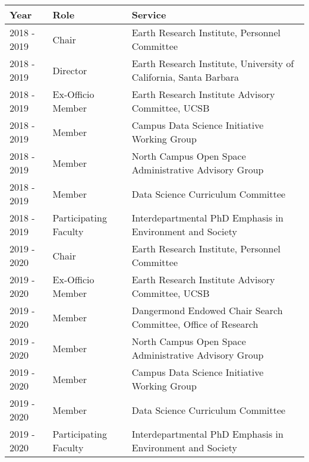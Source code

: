 
\begin{longtable}{llp{12cm}}
Year & Role & Service\\
\hline 
\endhead 
2018 - 2019 & Chair & Earth Research Institute, Personnel Committee \\
2018 - 2019 & Director & Earth Research Institute, University of California, Santa Barbara \\
2018 - 2019 & Ex-Officio Member & Earth Research Institute Advisory Committee, UCSB \\
2018 - 2019 & Member & Campus Data Science Initiative Working Group \\
2018 - 2019 & Member & North Campus Open Space Administrative Advisory Group \\
2018 - 2019 & Member & Data Science Curriculum Committee \\
2018 - 2019 & Participating Faculty & Interdepartmental PhD Emphasis in Environment and Society \\
2019 - 2020 & Chair & Earth Research Institute, Personnel Committee \\
2019 - 2020 & Ex-Officio Member & Earth Research Institute Advisory Committee, UCSB \\
2019 - 2020 & Member & Dangermond Endowed Chair Search Committee, Office of Research \\
2019 - 2020 & Member & North Campus Open Space Administrative Advisory Group \\
2019 - 2020 & Member & Campus Data Science Initiative Working Group \\
2019 - 2020 & Member & Data Science Curriculum Committee \\
2019 - 2020 & Participating Faculty & Interdepartmental PhD Emphasis in Environment and Society \\
\end{longtable}

